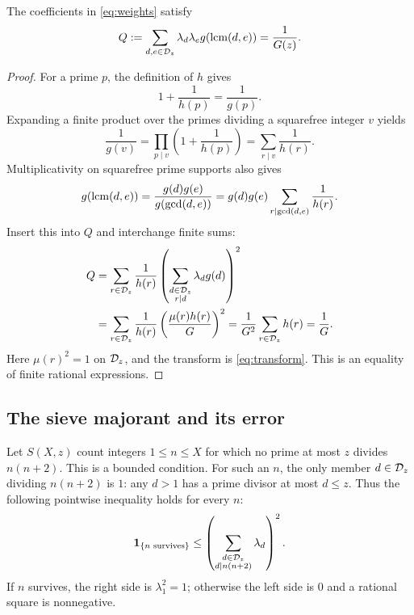 \begin{lemma}
\label{lem:quadratic}
The coefficients in \eqref{eq:weights} satisfy
\begin{equation}
 Q:=\sum_{d,e\in\mathcal D_z}\lambda_d\lambda_e
             g(\operatorname{lcm}(d,e))=\frac1{G(z)}.
 \label{eq:quadratic}
\end{equation}
\end{lemma}

\begin{proof}
For a prime \(p\), the definition of \(h\) gives
\[
 1+\frac1{h(p)}=\frac1{g(p)}.
\]
Expanding a finite product over the primes dividing a squarefree integer
\(v\) yields
\[
 \frac1{g(v)}
   =\prod_{p\mid v}\left(1+\frac1{h(p)}\right)
   =\sum_{r\mid v}\frac1{h(r)}.
\]
Multiplicativity on squarefree prime supports also gives
\[
 g(\operatorname{lcm}(d,e))=\frac{g(d)g(e)}{g(\gcd(d,e))}
   =g(d)g(e)\sum_{r\mid\gcd(d,e)}\frac1{h(r)}.
\]
Insert this into \(Q\) and interchange finite sums:
\begin{align*}
 Q
 &=\sum_{r\in\mathcal D_z}\frac1{h(r)}
       \left(\sum_{\substack{d\in\mathcal D_z\\r\mid d}}
                     \lambda_dg(d)\right)^2\\
 &=\sum_{r\in\mathcal D_z}\frac1{h(r)}
                 \left(\frac{\mu(r)h(r)}G\right)^2
   =\frac1{G^2}\sum_{r\in\mathcal D_z}h(r)
   =\frac1G.
\end{align*}
Here \(\mu(r)^2=1\) on \(\mathcal D_z\), and the transform is
\eqref{eq:transform}. This is an equality of finite rational expressions.
\end{proof}

\subsection{The sieve majorant and its error}

Let \(S(X,z)\) count integers \(1\le n\le X\) for which no prime at most
\(z\) divides \(n(n+2)\). This is a bounded condition.
For such an \(n\), the only member \(d\in\mathcal D_z\) dividing \(n(n+2)\)
is \(1\): any \(d>1\) has a prime divisor at most \(d\le z\).
Thus the following pointwise inequality holds for every \(n\):
\begin{equation}
 \mathbf 1_{\{n\text{ survives}\}}
 \le
 \left(\sum_{\substack{d\in\mathcal D_z\\d\mid n(n+2)}}\lambda_d\right)^2.
 \label{eq:majorant}
\end{equation}
If \(n\) survives, the right side is \(\lambda_1^2=1\); otherwise the
left side is \(0\) and a rational square is nonnegative.

